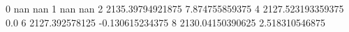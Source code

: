 0 nan nan
1 nan nan
2 2135.39794921875 7.874755859375
4 2127.523193359375 0.0
6 2127.392578125 -0.130615234375
8 2130.04150390625 2.518310546875

